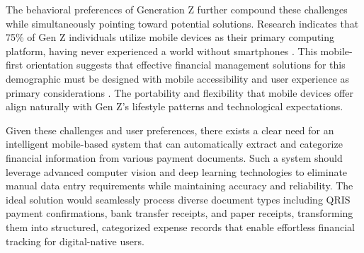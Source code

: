 The behavioral preferences of Generation Z further compound these challenges while simultaneously pointing toward potential solutions. Research indicates that 75\% of Gen Z individuals utilize mobile devices as their primary computing platform, having never experienced a world without smartphones \cite{Campfire2024GenZ}. This mobile-first orientation suggests that effective financial management solutions for this demographic must be designed with mobile accessibility and user experience as primary considerations \cite{wandhe2024new}. The portability and flexibility that mobile devices offer align naturally with Gen Z's lifestyle patterns and technological expectations.

Given these challenges and user preferences, there exists a clear need for an intelligent mobile-based system that can automatically extract and categorize financial information from various payment documents. Such a system should leverage advanced computer vision and deep learning technologies to eliminate manual data entry requirements while maintaining accuracy and reliability. The ideal solution would seamlessly process diverse document types including QRIS payment confirmations, bank transfer receipts, and paper receipts, transforming them into structured, categorized expense records that enable effortless financial tracking for digital-native users.